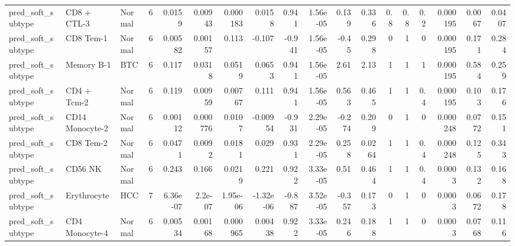 \begin{tabular}{lllrrrrrrrrrrrrrrr}
pred\_soft\_subtype & CD8 + CTL-3 & Normal & 6 & 0.0159 & 0.00943 & 0.000183 & 0.0158 & 0.941 & 1.56e-05 & 0.139 & 0.336 & 0.8 & 0.8 & 0.2 & 0.000195 & 0.0067 & 0.0407 \\
pred\_soft\_subtype & CD8 Tem-1 & Normal & 6 & 0.00582 & 0.00157 & 0.113 & -0.107 & -0.941 & 1.56e-05 & -0.45 & 0.298 & 0 & 1 & 0 & 0.000195 & 0.171 & 0.284 \\
pred\_soft\_subtype & Memory B-1 & BTC & 6 & 0.117 & 0.0318 & 0.0519 & 0.0653 & 0.941 & 1.56e-05 & 2.61 & 2.13 & 1 & 1 & 1 & 0.000195 & 0.584 & 0.259 \\
pred\_soft\_subtype & CD4 + Tcm-2 & Normal & 6 & 0.119 & 0.00959 & 0.00767 & 0.111 & 0.941 & 1.56e-05 & 0.563 & 0.465 & 1 & 1 & 0.4 & 0.000195 & 0.103 & 0.176 \\
pred\_soft\_subtype & CD14 Monocyte-2 & Normal & 6 & 0.00112 & 0.000776 & 0.0107 & -0.00954 & -0.931 & 2.29e-05 & -0.274 & 0.209 & 0 & 1 & 0 & 0.000248 & 0.0772 & 0.151 \\
pred\_soft\_subtype & CD8 Tem-2 & Normal & 6 & 0.0471 & 0.0092 & 0.0181 & 0.029 & 0.931 & 2.29e-05 & 0.258 & 0.0264 & 1 & 1 & 0.4 & 0.000248 & 0.125 & 0.343 \\
pred\_soft\_subtype & CD56 NK & Normal & 6 & 0.243 & 0.166 & 0.0219 & 0.221 & 0.922 & 3.33e-05 & 0.51 & 0.464 & 1 & 1 & 0.4 & 0.0003 & 0.132 & 0.168 \\
pred\_soft\_subtype & Erythrocyte & HCC & 7 & 6.36e-07 & 2.2e-07 & 1.95e-06 & -1.32e-06 & -0.887 & 3.52e-05 & -0.357 & 0.173 & 0 & 1 & 0 & 0.0003 & 0.0672 & 0.178 \\
pred\_soft\_subtype & CD4 Monocyte-4 & Normal & 6 & 0.00534 & 0.00168 & 0.000965 & 0.00438 & 0.922 & 3.33e-05 & 0.246 & 0.188 & 1 & 1 & 0 & 0.0003 & 0.0768 & 0.116 \\
\bottomrule
\end{tabular}
